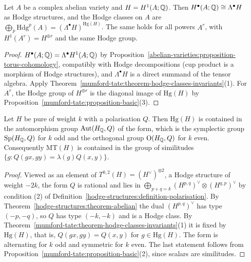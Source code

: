 \begin{corollary}\label{mumford-tate:corollary-hodge-ring-abelian}
Let $A$ be a complex abelian variety and $H = H^1(A; \mathbb{Q})$. Then $H^\bullet(A; \mathbb{Q}) \cong \Lambda^\bullet H$ as Hodge structures, and the Hodge classes on $A$ are
$\bigoplus_p\mathrm{Hdg}^p(A) = (\Lambda^\bullet H)^{\mathrm{Hg}(H)}$. The same holds for all powers $A^r$, with $H^1(A^r) = H^{\oplus r}$ and the same Hodge group.
\end{corollary}

\begin{proof}
$H^\bullet(A; \mathbb{Q}) = \Lambda^\bullet H^1(A; \mathbb{Q})$ by Proposition~\ref{abelian-varieties:proposition-torus-cohomology}, compatibly with Hodge decompositions (cup product is a morphism of Hodge
structures), and $\Lambda^\bullet H$ is a direct summand of the tensor algebra. Apply Theorem~\ref{mumford-tate:theorem-hodge-classes-invariants}(1). For $A^r$, the Hodge group of $H^{\oplus r}$ is the
diagonal image of $\mathrm{Hg}(H)$ by Proposition~\ref{mumford-tate:proposition-basic}(3).
\end{proof}

\begin{proposition}\label{mumford-tate:proposition-polarisation}
Let $H$ be pure of weight $k$ with a polarisation $Q$. Then $\mathrm{Hg}(H)$ is contained in the automorphism group $\mathrm{Aut}(H_{\mathbb{Q}}, Q)$ of the form, which is the symplectic group $\mathrm{Sp}(H_{\mathbb{Q}}, Q)$ for $k$ odd and
the orthogonal group $\mathrm{O}(H_{\mathbb{Q}}, Q)$ for $k$ even. Consequently $\mathrm{MT}(H)$ is contained in the group of similitudes $\{g : Q(gx, gy) = \lambda(g)Q(x, y)\}$.
\end{proposition}

\begin{proof}
Viewed as an element of $T^{0,2}(H) = (H^\vee)^{\otimes 2}$, a Hodge structure of weight $-2k$, the form $Q$ is rational and lies in $\bigoplus_{p+q=k}(H^{p,q})^\vee \otimes (H^{q,p})^\vee$ by condition (2) of
Definition~\ref{hodge-structures:definition-polarisation}. By Theorem~\ref{hodge-structures:theorem-abelian} the dual $(H^{p,q})^\vee$ has type $(-p,-q)$, so $Q$ has type $(-k, -k)$ and is a Hodge class. By
Theorem~\ref{mumford-tate:theorem-hodge-classes-invariants}(1) it is fixed by $\mathrm{Hg}(H)$, that is, $Q(gx, gy) = Q(x, y)$ for $g \in \mathrm{Hg}(H)$. The form is alternating for $k$ odd and symmetric for $k$ even. The
last statement follows from Proposition~\ref{mumford-tate:proposition-basic}(2), since scalars are similitudes.
\end{proof}

